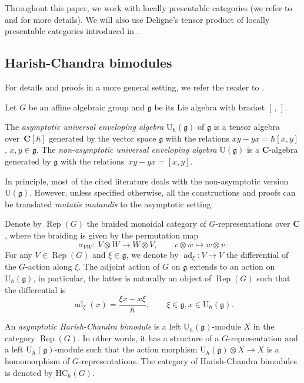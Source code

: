 \documentclass[10pt,a4paper]{amsart}
\numberwithin{equation}{section}
\newcommand{\C}{\mathbf{C}}
\newcommand{\U}{\mathrm{U}_{\hbar}}
\newcommand{\g}{\mathfrak{g}}
\DeclareMathOperator{\ad}{ad}
\newcommand{\HC}{\mathrm{HC}_{\hbar}}
\DeclareMathOperator{\Rep}{Rep}
\begin{document}
Throughout this paper, we work with locally presentable categories (we refer to \cite{AdamekRosicky} and \cite[Section 2]{BCJF} for more details). We will also use Deligne's tensor product of locally presentable categories introduced in \cite{Deligne}.
	
	
	\subsection{Harish-Chandra bimodules}
	\label{subsect::hc_bimod}
	For details and proofs in a more general setting, we refer the reader to \cite[Section 2]{KalmykovSafronov}.
	
	Let $G$ be an affine algebraic group and $\g$ be its Lie algebra with bracket $[\,,\,]$.
	
	\begin{Definition}
		\label{def::asympt_uea}
		The \emph{asymptotic universal enveloping algebra} $\U(\g)$ of $\g$ is a tensor algebra over~$\C[\hbar]$ generated by the vector space $\g$ with the relations
$
		xy - yx = \hbar [x,y]$, $ x,y\in \g$.
		The \emph{non-asymptotic universal enveloping algebra} $\mathrm{U}(\g)$ is a $\C$-algebra generated by $\g$ with the relations~${xy - yx = [x,y]}$.
	\end{Definition}
	
	\begin{Remark}
		In principle, most of the cited literature deals with the non-asymptotic version~$\mathrm{U}(\g)$. However, unless specified otherwise, all the constructions and proofs can be translated \emph{mutatis mutandis} to the asymptotic setting.
	\end{Remark}
	
	Denote by $\Rep(G)$ the braided monoidal category of $G$-representations over $\C$, where the braiding is given by the permutation map
	\[
	\sigma_{VW} \colon\ V \otimes W \rightarrow W \otimes V, \qquad v\otimes w \mapsto w \otimes v.
	\]
	For any $V \in \Rep(G)$ and $\xi\in \g$, we denote by $\ad_{\xi} \colon V \rightarrow V$ the differential of the $G$-action along $\xi$. The adjoint action of $G$ on $\g$ extends to an action on $\U(\g)$, in particular, the latter is naturally an object of $\Rep(G)$ such that the differential is
	\begin{equation*}
		\ad_{\xi}(x) = \frac{\xi x - x \xi}{\hbar},\qquad \xi\in \g, x\in \U(\g).
	\end{equation*}
	
	\begin{Definition}
		An \emph{asymptotic Harish-Chandra bimodule} is a left $\U(\g)$-module $X$ in the category $\Rep(G)$. In other words, it has a structure of a $G$-representation and a left $\U(\g)$-module such that the action morphism
		$
		\U(\g) \otimes X \rightarrow X
		$
		is a homomorphism of $G$-representations. The category of Harish-Chandra bimodules is denoted by $\HC(G)$.
	\end{Definition}
	
\end{document}
